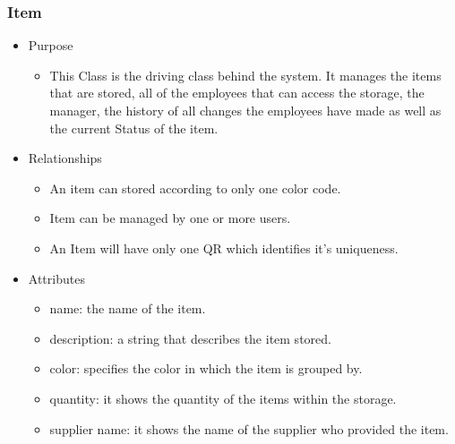 \documentclass[hidelinks, 12pt, a4paper]{article}
\begin{document}
\begin{itemize}
    \subsubsection{Item}
    \begin{itemize}
        \item Purpose
        \begin{itemize}
            \item This Class is the driving class behind the system. It manages the items that are stored, all of the employees that can access the storage, the manager, the history of all changes the employees have made as well as the current Status of the item.
        \end{itemize}
        \item  Relationships
        \begin{itemize}
            \item An item can stored according to only one color code.
            \item Item can be managed by one or more users.
            \item An Item will have only one QR which identifies it's uniqueness.
        \end{itemize}
        \item Attributes
        \begin{itemize}
            \item name: the name of the item.
            \item description: a string that describes the item stored.
            \item color: specifies the color in which the item is grouped by.
            \item quantity: it shows the quantity of the items within the storage.
            \item supplier name: it shows the name of the supplier who provided the item.
        \end{itemize}

    \end{itemize}



\end{itemize}
\end{document}
